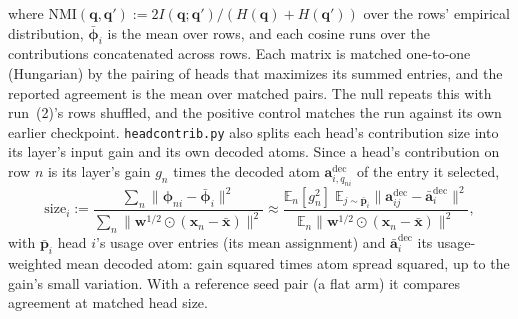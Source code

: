 where $\mathrm{NMI}(\mathbf{q}, \mathbf{q}') := 2I(\mathbf{q};\mathbf{q}')/
(H(\mathbf{q})+H(\mathbf{q}'))$ over the rows' empirical distribution,
$\bar{\boldsymbol{\phi}}_i$ is the mean over rows, and each cosine runs
over the contributions concatenated across rows. Each matrix is matched
one-to-one (Hungarian) by the pairing of heads that maximizes its summed
entries, and the reported agreement is the mean over matched pairs. The
null repeats this with run~(2)'s rows shuffled, and the positive control
matches the run against its own earlier checkpoint.
\texttt{headcontrib.py} also splits each head's contribution size into its
layer's input gain and its own decoded atoms. Since a head's contribution
on row $n$ is its layer's gain $g_n$ times the decoded atom
$\mathbf{a}^{\mathrm{dec}}_{i,q_{ni}}$ of the entry it selected,
\begin{equation}
	\mathrm{size}_i := \frac{\sum_n \lVert \boldsymbol{\phi}_{ni} - \bar{\boldsymbol{\phi}}_i\rVert^2}
	                       {\sum_n \lVert \mathbf{w}^{1/2} \odot (\mathbf{x}_n - \bar{\mathbf{x}})\rVert^2}
	\approx \frac{\mathbb{E}_n[g_n^2]\; \mathbb{E}_{j \sim \bar{\mathbf{p}}_i}
	        \lVert \mathbf{a}^{\mathrm{dec}}_{ij} - \bar{\mathbf{a}}^{\mathrm{dec}}_i\rVert^2}
	       {\mathbb{E}_n \lVert \mathbf{w}^{1/2} \odot (\mathbf{x}_n - \bar{\mathbf{x}})\rVert^2},
	\label{eq:headsize}
\end{equation}
with $\bar{\mathbf{p}}_i$ head $i$'s usage over entries (its mean
assignment) and $\bar{\mathbf{a}}^{\mathrm{dec}}_i$ its usage-weighted
mean decoded atom: gain squared times atom spread squared, up to the
gain's small variation. With a reference seed pair (a flat arm) it
compares agreement at matched head size.

